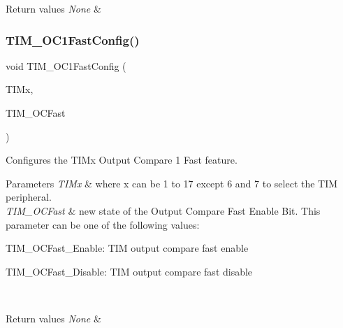 \begin{DoxyRetVals}{Return values}
{\em None} & \\
\hline
\end{DoxyRetVals}
\mbox{\label{group___t_i_m___exported___functions_gaec82031ca62f31f5483195c09752a83a}} 
\subsubsection{\texorpdfstring{TIM\_OC1FastConfig()}{TIM\_OC1FastConfig()}}
{\footnotesize\ttfamily void T\+I\+M\+\_\+\+O\+C1\+Fast\+Config (\begin{DoxyParamCaption}\item[{\mbox{\hyperlink{struct_t_i_m___type_def}{T\+I\+M\+\_\+\+Type\+Def}} $\ast$}]{T\+I\+Mx,  }\item[{uint16\+\_\+t}]{T\+I\+M\+\_\+\+O\+C\+Fast }\end{DoxyParamCaption})}



Configures the T\+I\+Mx Output Compare 1 Fast feature. 


\begin{DoxyParams}{Parameters}
{\em T\+I\+Mx} & where x can be 1 to 17 except 6 and 7 to select the T\+IM peripheral. \\
\hline
{\em T\+I\+M\+\_\+\+O\+C\+Fast} & new state of the Output Compare Fast Enable Bit. This parameter can be one of the following values\+: \begin{DoxyItemize}
\item T\+I\+M\+\_\+\+O\+C\+Fast\+\_\+\+Enable\+: T\+IM output compare fast enable \item T\+I\+M\+\_\+\+O\+C\+Fast\+\_\+\+Disable\+: T\+IM output compare fast disable \end{DoxyItemize}
\\
\hline
\end{DoxyParams}

\begin{DoxyRetVals}{Return values}
{\em None} & \\
\hline
\end{DoxyRetVals}
\mbox{\label{group___t_i_m___exported___functions_gafcdb6ff00158862aef7fed5e7a554a3e}} 
